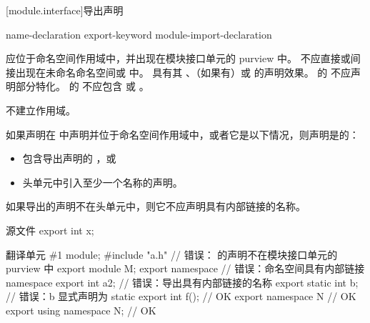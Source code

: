 [module.interface]{导出声明}%

\begin{bnf}
\br
     name-declaration\br
     \terminal{\{}  \terminal{\}}\br
    export-keyword module-import-declaration
\end{bnf}

\pnum
{} 应位于命名空间作用域中，并出现在模块接口单元的 purview 中。 不应直接或间接出现在未命名命名空间或  中。  具有其 、（如果有）或  的声明效果。  的  不应声明部分特化。  的  不应包含  或 。
\begin{note}
 不建立作用域。
\end{note}

\pnum
如果声明在  中声明并位于命名空间作用域中，或者它是以下情况，则声明是的：
\begin{itemize}
\item 包含导出声明的 ，或
\item 头单元中引入至少一个名称的声明。
\end{itemize}

\pnum
如果导出的声明不在头单元中，则它不应声明具有内部链接的名称。

\pnum
\begin{example}
\begin{codeblocktu}{源文件 }
export int x;
\end{codeblocktu}

\begin{codeblocktu}{翻译单元 \#1}
module;
#include "a.h"                  // 错误： 的声明不在模块接口单元的 purview 中
export module M;
export namespace {}             // 错误：命名空间具有内部链接
namespace {
  export int a2;                // 错误：导出具有内部链接的名称
}
export static int b;            // 错误：b 显式声明为 static
export int f();                 // OK
export namespace N { }          // OK
export using namespace N;       // OK
\end{codeblocktu}
\end{example}

